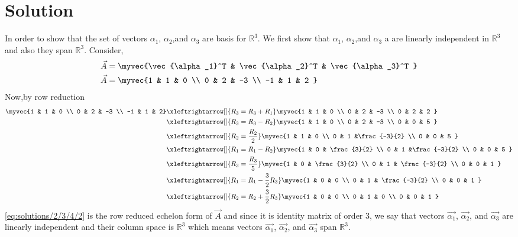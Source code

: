 \section{Solution}
In order to show that the set of vectors $\alpha_1$, $\alpha_2$,and $\alpha_3$  are basis for $\mathbb{R}^3$. We first show that $\alpha_1$, $\alpha_2$,and $\alpha_3$ a  are linearly independent in $\mathbb{R}^3$ and also they span $\mathbb{R}^3$. Consider,
\begin{align}
& \vec{A} = \myvec{\vec{\alpha_1}^T & \vec{\alpha_2}^T & \vec{\alpha_3}^T } \\
& \vec{A} = \myvec{1 & 1 &  0 \\ 0 & 2 & -3  \\ -1 & 1 & 2 }\label{eq:solutions/2/3/4/eqA}
\end{align}
Now,by row reduction
\begin{align}
\myvec{1 & 1 &  0 \\ 0 & 2 & -3  \\ -1 & 1 & 2} &\xleftrightarrow[]{R_3=R_3+R_1}\myvec{1 & 1 &  0 \\ 0 & 2 & -3  \\ 0 & 2 & 2  } \\
 &\xleftrightarrow[]{R_3=R_3-R_2}\myvec{1 & 1 &  0 \\ 0 & 2 & -3  \\ 0 & 0 & 5  } \\
&\xleftrightarrow[]{R_2=\frac{R_2}{2}}\myvec{1 & 1 &  0 \\ 0 & 1 &\frac{-3}{2}   \\ 0 & 0 & 5  } \\
&\xleftrightarrow[]{R_1=R_1-R_2}\myvec{1 & 0 &  \frac{3}{2} \\ 0 & 1 &\frac{-3}{2}   \\ 0 & 0 & 5  } \\
&\xleftrightarrow[]{R_3=\frac{R_3}{5}}\myvec{1 & 0 &   \frac{3}{2} \\ 0 & 1 & \frac{-3}{2}   \\ 0 & 0 & 1  } \\
&\xleftrightarrow[]{R_1=R_1-\frac{3}{2}R_3}\myvec{1 & 0 &  0 \\ 0 & 1 & \frac{-3}{2}   \\ 0 & 0 & 1  } \\
&\xleftrightarrow[]{R_2=R_2+\frac{3}{2}R_3}\myvec{1 & 0 &  0 \\ 0 & 1 & 0  \\ 0 & 0 & 1  } \label{eq:solutions/2/3/4/2}
\end{align}
\eqref{eq:solutions/2/3/4/2} is the row reduced echelon form of $\vec{A}$ and since it is identity matrix of order 3, we say that vectors $\vec{\alpha_1}$, $\vec{\alpha_2}$, and $\vec{\alpha_3}$  are linearly independent and their column space is $\mathbb{R}^3$ which means vectors $\vec{\alpha_1}$, $\vec{\alpha_2}$, and $\vec{\alpha_3}$  span $\mathbb{R}^3$.
